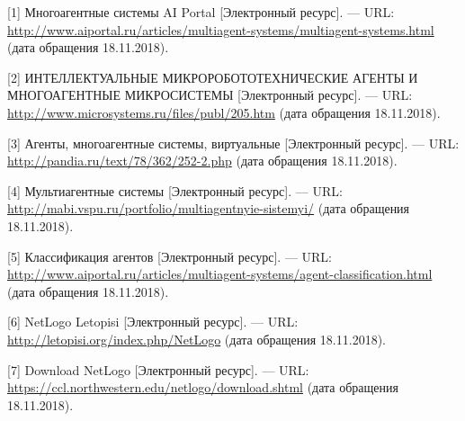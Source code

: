 \documentclass[14pt,a4paper,report]{report}
\begin{document}
\begin{flushleft}
	
[1] Многоагентные системы AI Portal [Электронный ресурс]. — URL: \href{http://www.aiportal.ru/articles/multiagent-systems/multiagent-systems.html}{http://www.aiportal.ru/articles/multiagent-systems/multiagent-systems.html} (дата обращения 18.11.2018). \linebreak
	
[2] ИНТЕЛЛЕКТУАЛЬНЫЕ МИКРОРОБОТОТЕХНИЧЕСКИЕ АГЕНТЫ И МНОГОАГЕНТНЫЕ МИКРОСИСТЕМЫ [Электронный ресурс]. — URL: \href{http://www.microsystems.ru/files/publ/205.htm}{http://www.microsystems.ru/files/publ/205.htm} (дата обращения 18.11.2018). \linebreak

[3] Агенты, многоагентные системы, виртуальные [Электронный ресурс]. — URL: \href{http://pandia.ru/text/78/362/252-2.php}{http://pandia.ru/text/78/362/252-2.php} (дата обращения 18.11.2018). \linebreak

[4] Мультиагентные системы [Электронный ресурс]. — URL: \href{http://mabi.vspu.ru/portfolio/multiagentnyie-sistemyi/}{http://mabi.vspu.ru/portfolio/multiagentnyie-sistemyi/} (дата обращения 18.11.2018). \linebreak

[5] Классификация агентов [Электронный ресурс]. — URL: \href{http://www.aiportal.ru/articles/multiagent-systems/agent-classification.html}{http://www.aiportal.ru/articles/multiagent-systems/agent-classification.html} (дата обращения 18.11.2018). \linebreak

[6] NetLogo Letopisi [Электронный ресурс]. — URL: \href{http://letopisi.org/index.php/NetLogo}{http://letopisi.org/index.php/NetLogo} (дата обращения 18.11.2018). \linebreak

[7] Download NetLogo [Электронный ресурс]. — URL: \href{https://ccl.northwestern.edu/netlogo/download.shtml}{https://ccl.northwestern.edu/netlogo/download.shtml} (дата обращения 18.11.2018). \linebreak

\end{flushleft}
	
\end{document}
